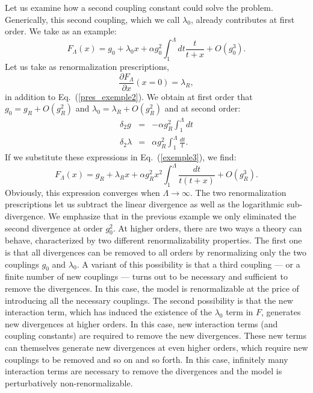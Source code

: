 \documentclass[floatfix,twocolumn,preprintnumbers,amsmath,amssymb,prb]{revtex4}
\begin{document}
{{Let us examine how a second coupling constant could solve the
problem. Generically, this second coupling, which we call
$\lambda_0$, already contributes at first order. We take as an
example:
\begin{equation}
F_{\Lambda}(x)=g_0 +\lambda_0 x + \alpha g_0^2 \int_1^\Lambda dt 
\frac{t}{t+x}+O(g_0^3).
\label{exemple3}
\end{equation}
Let us take as renormalization prescriptions,
\begin{equation}
\frac{\partial F_{\Lambda}}{\partial x} (x=0)=\lambda_R,
\end{equation}
in addition to Eq.~(\ref{pres_exemple2}). We obtain at first order
that $g_0=g_R +O(g_R^2)$ and $\lambda_0=\lambda_R +O(g_R^2)$ and
at second order:
\begin{eqnarray}
\delta_2 g&=& -\alpha g_R^2
\int_1^\Lambda dt\\
\delta_2 \lambda&=& \alpha g_R^2 \int_1^\Lambda
\frac{dt}{t}.
\end{eqnarray}
If we substitute these expressions in Eq.~(\ref{exemple3}), we
find:
\begin{equation}
F_{\Lambda}(x)=g_R +\lambda_R x + \alpha g_R^2 x^2\int_1^\Lambda
\frac{dt}{t(t+x)}+O(g_R^3).
\label{a8}
\end{equation} Obviously, this expression converges when
$\Lambda\to \infty$. The two renormalization prescriptions let us
subtract the linear divergence as well as the logarithmic
sub-divergence. We emphasize that in the previous example we 
only eliminated the second divergence at order $g_0^2$. At higher
orders, there are two ways a theory can behave, characterized by
two different renormalizability properties. The first one is that
all divergences can be removed to all orders by renormalizing
only the two couplings $g_0$ and $\lambda_0$. A variant of this
possibility is that a third coupling --- or a finite number of new
couplings --- turns out to be necessary and sufficient to remove
the divergences. In this case, the model is renormalizable at the price of introducing all
the necessary couplings. The
second possibility is that the new interaction term, which has
induced the existence of the $\lambda_0$ term in $F$, generates 
new divergences at
higher orders. In this case, new interaction terms (and coupling
constants) are required to remove the new divergences. These
new terms can themselves generate new
divergences at even higher orders, which require new couplings
to be removed and so on and so forth. In this case, infinitely
many interaction terms are necessary to remove the divergences
and the model is perturbatively non-renormalizable.

}}
\end{document}
